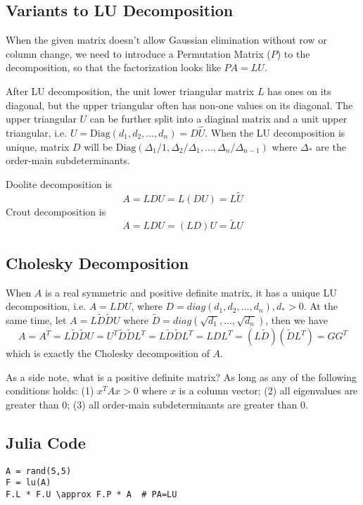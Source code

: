 \subsection{Variants to LU Decomposition}

When the given matrix doesn't allow Gaussian elimination without row or
column change, we need to introduce a Permutation Matrix ($P$) to the
decomposition, so that the factorization looks like $PA=LU$.

After LU decomposition, the unit lower triangular matrix $L$ has ones on
its diagonal, but the upper triangular often has non-one values on its
diagonal. The upper triangular $U$ can be further split into a diaginal
matrix and a unit upper triangular, i.e.
$U = \text{Diag}(d_1, d_2, \ldots, d_n) = D\hat{U}$.
When the LU decomposition is unique, matrix $D$ will be
$\text{Diag}(\Delta_1/1, \Delta_2/\Delta_1, \ldots, \Delta_n/\Delta_{n-1})$
where $\Delta_\ast$ are the order-main subdeterminants.

Doolite decomposition is
$$A = LDU = L(DU) = L\tilde{U}$$
Crout decomposition is
$$A = LDU = (LD)U = \tilde{L}U$$

\subsection{Cholesky Decomposition}

When $A$ is a real symmetric and positive definite matrix, it has a unique
LU decomposition, i.e. $A = LDU$, where $D=diag(d_1, d_2, \ldots, d_n), d_\ast > 0$.
At the same time, let $A = L\tilde{D}\tilde{D}U$ where $\tilde{D}=diag(\sqrt{d_1}, \ldots, \sqrt{d_n})$,
then we have
$$ A = A^T = L\tilde{D}\tilde{D}U = U^T\tilde{D}\tilde{D}L^T = L\tilde{D}\tilde{D} L^T = LDL^T = (L\tilde{D})(\tilde{D}L^T) = GG^T$$
which is exactly the Cholesky decomposition of $A$.

As a side note, what is a positive definite matrix? As long as any of the
following conditions holds: (1) $x^TAx>0$ where $x$ is a column vector;
(2) all eigenvalues are greater than 0; (3) all order-main subdeterminants
are greater than 0.

\subsection{Julia Code}

\begin{verbatim}
A = rand(5,5)
F = lu(A)
F.L * F.U \approx F.P * A  # PA=LU
\end{verbatim}
